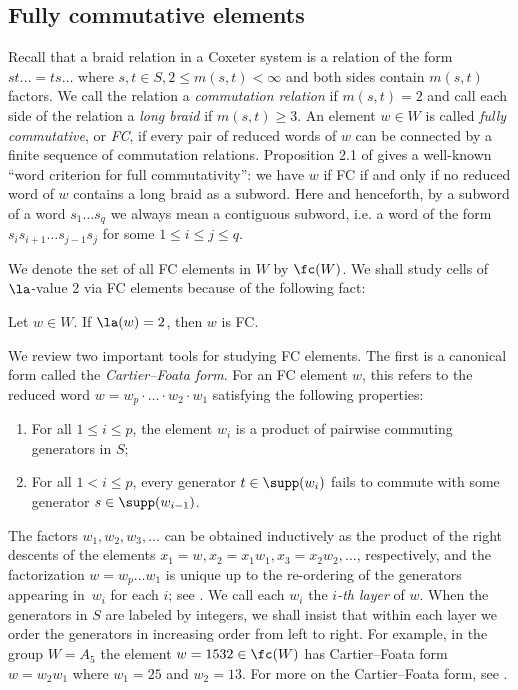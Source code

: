\subsection{Fully commutative elements}
\label{sec:FC}

Recall that a braid relation in a Coxeter system is a relation of the form $st\dots =ts\dots$ where
$s,t\in S, 2\le m(s,t)<\infty$ and both sides contain $m(s,t)$ factors. We call the relation a
\emph{commutation relation} if $m(s,t)=2$ and call each side of the relation a \emph{long braid} if
$m(s,t)\ge 3$. An element $w\in W$ is called \emph{fully commutative}, or \emph{FC}, if every pair
of reduced words of $w$ can be connected by a finite sequence of commutation relations. Proposition
2.1 of \cite{FC} gives a well-known ``word criterion for full commutativity'': we have $w$ if FC if
and only if no reduced word of $w$ contains a long braid as a subword. Here and henceforth, by a
subword of a word $s_1\dots s_q$ we always mean a contiguous subword, i.e. a word of the form
$s_is_{i+1}\dots s_{j-1}s_{j}$ for some $1\le i\le j\le q$.

We denote the set of all FC elements in $W$ by $\fc(W)$. We shall study cells of $\la$-value 2 via
FC elements because of the following fact:

\begin{prop} \label{prop:a2impliesFC} 
    Let $w\in W$. If $\la(w)=2$, then $w$ is FC.  
\end{prop} 
 
We review two important tools for studying FC elements.  The first is a canonical form called the
\emph{Cartier--Foata form}. For an FC element $w$, this refers to the reduced word $w=w_p\cdot \dots
\cdot w_2\cdot w_1$ satisfying the following properties:
\begin{enumerate}
    \item  For all $1\le i\le p$, the element $w_i$ is a product of pairwise commuting generators in
         $S$;
    \item For all $1<i\le p$, every generator $t\in \supp(w_i)$ fails to commute with some generator
         $s\in \supp(w_{i-1})$.
\end{enumerate} 
The factors $w_1,w_2,w_3,\ldots$ can be obtained inductively as the product of the right descents of
the elements $x_1=w, x_2=x_1w_1, x_3=x_2w_2, \ldots $, respectively, and the factorization $w=w_p\dots w_1$
is unique up to the re-ordering of the generators appearing in~$w_i$ for each $i$; see
\cite{GreenStarReducible}.  We call each $w_i$ the \emph{$i$-th layer} of $w$. When the generators
in $S$ are labeled by integers, we shall insist that within each layer we order the generators in
increasing order from left to right. For example, in the group $W=A_5$ the element $w=1532\in
\fc(W)$ has Cartier--Foata form $w=w_2w_1$ where $w_1=25$ and $w_2=13$.  For more on the
Cartier--Foata form, see \cite{GreenStarReducible}.

